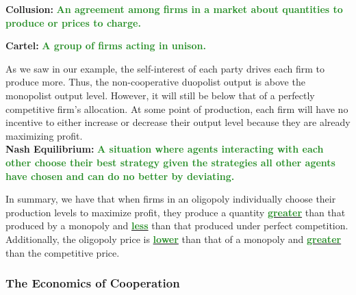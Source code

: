 \documentclass[11pt]{article}\usepackage[]{graphicx}\usepackage[]{color}
\theoremstyle{definition}
\newcommand{\ddp}[1]{{\textbf{\textcolor{ForestGreen}{#1}}}}
\newcommand{\dd}[1]{{\underline{\textbf{\textcolor{ForestGreen}{#1}}}}}
\newcommand{\defn}[1]{\textbf{#1}}
\begin{document}
	
	
	\defn{Collusion:} \ddp{An agreement among firms in a market about quantities to produce or prices to charge.\\}
	
	
	\defn{Cartel:} \ddp{A group of firms acting in unison.\\}
	
	As we saw in our example, the self-interest of each party drives each firm to produce more. Thus, the non-cooperative duopolist output is above the monopolist output level. However, it will still be below that of a perfectly competitive firm's allocation. At some point of production, each firm will have no incentive to either increase or decrease their output level because they are already maximizing profit. 
	\\
	
	\defn{Nash Equilibrium:} \ddp{A situation where agents interacting with each other choose their best strategy given the strategies all other agents have chosen and can do no better by deviating.\\}
	
	In summary, we have that when firms in an oligopoly individually choose their production levels to maximize profit, they produce a quantity \dd{greater} than that produced by a monopoly and \dd{less} than that produced under perfect competition. Additionally, the oligopoly price is \dd{lower} than that of a monopoly and \dd{greater} than the competitive price.
	
	\subsubsection*{The Economics of Cooperation}
	
\end{document}
